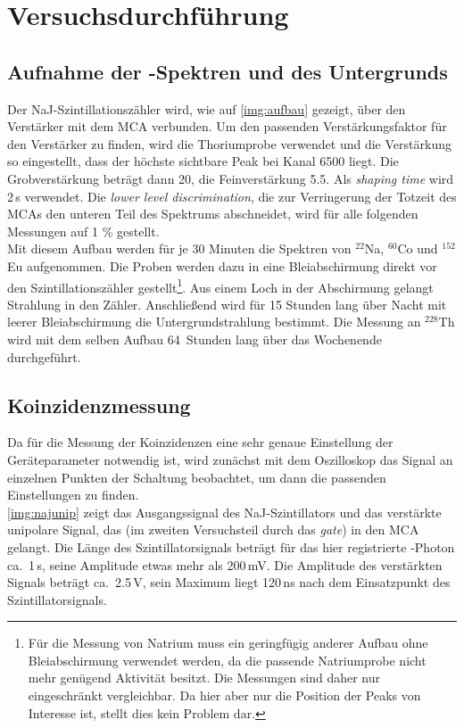 \section{Versuchsdurchführung}

\subsection{Aufnahme der \textgamma-Spektren und des Untergrunds}
Der NaJ-Szintillationszähler wird, wie auf \autoref{img:aufbau} gezeigt, über den Verstärker mit
dem MCA verbunden.
Um den passenden Verstärkungsfaktor für den Verstärker zu finden, wird die Thoriumprobe verwendet
und die Verstärkung so eingestellt, dass der höchste sichtbare Peak bei Kanal 6500 liegt.
Die Grobverstärkung beträgt dann 20, die Feinverstärkung 5.5. Als \emph{shaping time} wird 2\,\textmu s verwendet.
Die \emph{lower level discrimination}, die zur Verringerung der Totzeit des MCAs den unteren Teil des
Spektrums abschneidet, wird für alle folgenden Messungen auf 1 \% gestellt.\\
Mit diesem Aufbau werden für je 30 Minuten die Spektren von ${}^{22}$Na, ${}^{60}$Co und ${}^{152}$Eu aufgenommen.
Die Proben werden dazu in eine Bleiabschirmung direkt vor den Szintillationszähler gestellt\footnote{Für die
Messung von Natrium muss ein geringfügig anderer Aufbau ohne Bleiabschirmung verwendet werden,
da die passende Natriumprobe nicht mehr genügend Aktivität besitzt.
Die Messungen sind daher nur eingeschränkt vergleichbar.
Da hier aber nur die Position der Peaks von Interesse ist, stellt dies kein Problem dar.}.
Aus einem Loch in der Abschirmung gelangt Strahlung in den Zähler.
Anschließend wird für 15 Stunden lang über Nacht mit leerer Bleiabschirmung die Untergrundstrahlung bestimmt.
Die Messung an ${}^{228}$Th wird mit dem selben Aufbau 64~Stunden lang über das Wochenende durchgeführt.

\subsection{Koinzidenzmessung}

Da für die Messung der Koinzidenzen eine sehr genaue Einstellung der Geräteparameter notwendig ist,
wird zunächst mit dem Oszilloskop das Signal an einzelnen Punkten der Schaltung beobachtet,
um dann die passenden Einstellungen zu finden.\\
\autoref{img:najunip} zeigt das Ausgangssignal des NaJ-Szintillators und das verstärkte unipolare Signal,
das (im zweiten Versuchsteil durch das \emph{gate}) in den MCA gelangt.
Die Länge des Szintillatorsignals beträgt für das hier registrierte \textgamma-Photon ca.~1\,\textmu s,
seine Amplitude etwas mehr als 200\,mV.
Die Amplitude des verstärkten Signals beträgt ca.~2.5\,V,
sein Maximum liegt 120\,ns nach dem Einsatzpunkt des Szintillatorsignals.


